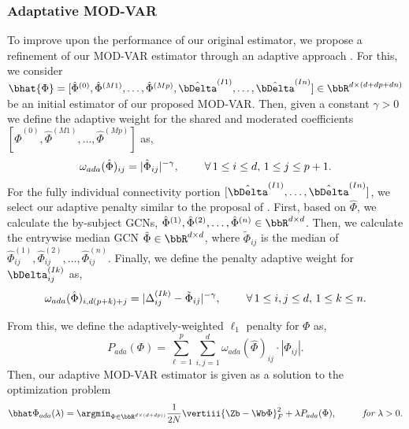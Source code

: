 \subsubsection{Adaptative MOD-VAR}


To improve upon the performance of our original estimator, we propose a refinement of our MOD-VAR estimator through an adaptive approach \citep{zou2006adaptive}. For this, we consider  $\bhat{\Phi}= [\hat{\Phi}^{(0)}, \hat{\Phi}^{(M1)}, \ldots ,\hat{\Phi}^{(Mp)}, \hat{\bDelta}^{(I1)},\ldots , \hat{\bDelta}^{(In)}]\in\bbR^{d\times (d+dp+dn)}$ be an initial estimator of our proposed MOD-VAR. Then, given a constant $\gamma > 0$ we define the adaptive weight for the shared and moderated coefficients $[\hat{\Phi}^{(0)}, \hat{\Phi}^{(M1)}, \ldots ,\hat{\Phi}^{(Mp)}]$ as,
\begin{equation*}
	\omega_{ada}(\hat\Phi)_{ij}  = 
		|\hat\Phi_{ij}|^{-\gamma}, \hspace{8mm}\forall\, 1\leq i\leq d,\, 1\leq j \leq p+1.
\end{equation*}
For the fully individual connectivity portion $[\hat{\bDelta}^{(I1)},\ldots , \hat{\bDelta}^{(In)}]$, we select our adaptive penalty similar to the proposal of \citet{fisher2024structured}. First, based on $\hat{\Phi}$, we calculate the by-subject GCNs, $\hat{\Phi}^{(1)},\hat{\Phi}^{(2)},\ldots, \hat{\Phi}^{(n)}\in\bbR^{d\times d}$. Then, we calculate the entrywise median GCN $\tilde{\Phi}\in\bbR^{d\times d}$, where $\tilde{\Phi}_{ij}$ is the median of $\hat{\Phi}^{(1)}_{ij},\hat{\Phi}^{(2)}_{ij},\ldots, \hat{\Phi}^{(n)}_{ij}$. Finally, we define the penalty adaptive weight for $\bDelta^{(Ik)}_{ij}$ as,
\begin{equation*}
	\omega_{ada}(\hat\Phi)_{i,d(p+k)+j}  = 
	|\Delta^{(Ik)}_{ij} - \tilde{\Phi}_{ij}|^{-\gamma}, \hspace{8mm}\forall\, 1\leq i,j\leq d,\, 1\leq k \leq n.
\end{equation*}


From this, we define the adaptively-weighted $\ell_1$ penalty for $\Phi$ as,
\begin{equation}
	P_{ada}(\Phi)  = \sum_{\ell = 1}^{p}\sum_{i, j=1}^{d} \omega_{ada}(\hat\Phi)_{ij}\cdot |\Phi_{ij}|.
\end{equation}
Then, our adaptive MOD-VAR estimator is given as a solution to the optimization problem
\begin{equation*}\label{eq:rvar_opt}
	\bhat\Phi_{ada}(\lambda) = \argmin_{\Phi \in \bbR^{d \times (d+dp))}} \frac{1}{2N}\vertiii{ \Zb - \Wb \Phi }_{F}^2 + \lambda P_{ada}(\Phi), \hspace{10mm} \textit{for } \lambda > 0 . 
\end{equation*}



